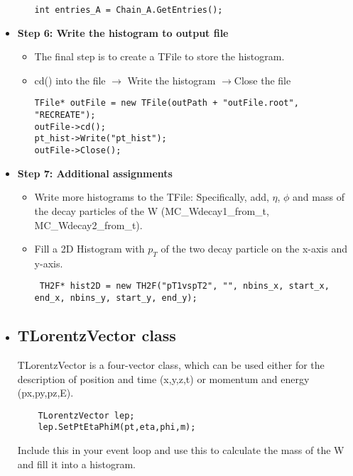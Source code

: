 \documentclass[letterpaper,12pt]{article}
\begin{document}
\begin{itemize}
\begin{itemize}
\begin{lstlisting}
int entries_A = Chain_A.GetEntries();
\end{lstlisting}
\end{itemize}
\item {\bf Step 6: Write the histogram to output file}
\begin{itemize}
	\item The final step is to create a TFile to store the histogram. 
\item cd() into the file $\rightarrow$ Write the histogram $\rightarrow$Close the file

\begin{lstlisting}     
TFile* outFile = new TFile(outPath + "outFile.root", "RECREATE");
outFile->cd();             
pt_hist->Write("pt_hist");
outFile->Close();                                                    
         \end{lstlisting}
\end{itemize}

\item{\bf Step 7: Additional assignments}
\begin{itemize}
	\item Write more histograms to the TFile: Specifically, add, $\eta$, $\phi$ and mass of the decay particles of the W (MC\_Wdecay1\_from\_t, MC\_Wdecay2\_from\_t).
	\item Fill a 2D Histogram with $p_{T}$ of the two decay particle on the x-axis and y-axis.
	\begin{lstlisting}
 TH2F* hist2D = new TH2F("pT1vspT2", "", nbins_x, start_x, end_x, nbins_y, start_y, end_y);
\end{lstlisting}


\end{itemize}
\item \subsection{TLorentzVector class}
TLorentzVector is a four-vector class, which can be used either for the description of position and time (x,y,z,t) or momentum and energy (px,py,pz,E).

\begin{lstlisting}
	TLorentzVector lep;
	lep.SetPtEtaPhiM(pt,eta,phi,m);
\end{lstlisting}

Include this in your event loop and use this to calculate the mass of the W and fill it into a histogram.
\end{itemize}
\end{document}
